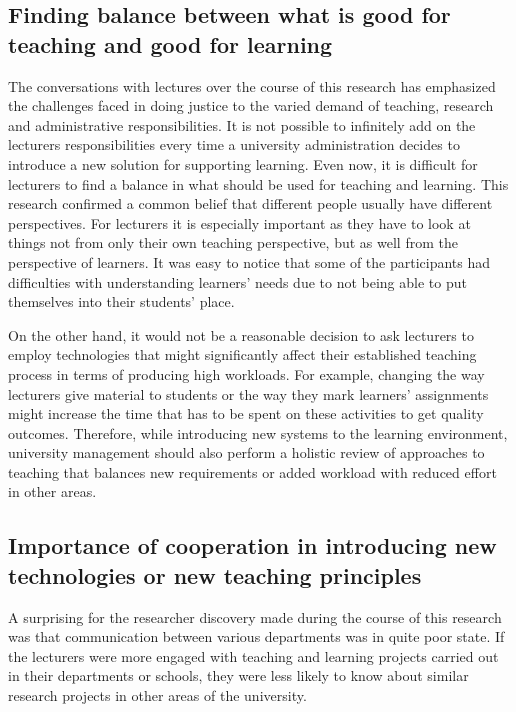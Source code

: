 \subsection[Finding Balance]{Finding balance between what is good for teaching
and good for learning}

The conversations with lectures over the course of this research has emphasized
the challenges faced in doing justice to the varied demand of teaching, research
and administrative responsibilities. It is not possible to infinitely add on the
lecturers responsibilities every time a university administration decides to
introduce a new solution for supporting learning. Even now, it is difficult for
lecturers to find a balance in what should be used for teaching and learning.
This research confirmed a common belief that different people usually have
different perspectives. For lecturers it is especially important as they have to
look at things not from only their own teaching perspective, but as well from
the perspective of learners. It was easy to notice that some of the participants
had difficulties with understanding learners' needs due to not being able to put
themselves into their students' place.

On the other hand, it would not be a reasonable decision to ask lecturers to
employ technologies that might significantly affect their established
teaching process in terms of producing high workloads. For example, changing the
way lecturers give material to students or the way they mark learners'
assignments might increase the time that has to be spent on these activities to
get quality outcomes. Therefore, while introducing new systems to the learning
environment, university management should also perform a holistic review of
approaches to teaching that balances new requirements or added workload with
reduced effort in other areas.

\subsection[Cooperation and Communication]{Importance of cooperation in 
introducing new technologies or new teaching principles}

A surprising for the researcher discovery made during the course of this
research was that communication between various departments was in quite poor
state. If the lecturers were more engaged with teaching and learning projects
carried out in their departments or schools, they were less likely to know about
similar research projects in other areas of the university. 

